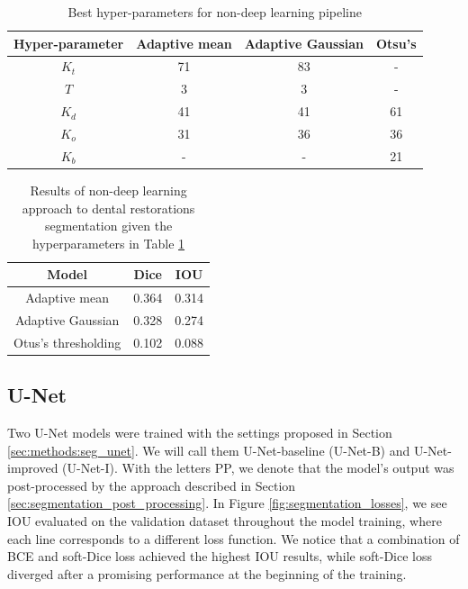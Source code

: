 \begin{table}[H]
    \begin{tabular}{|c|c|c|c|}
        \hline
        Hyper-parameter & Adaptive mean & Adaptive Gaussian & Otsu's \\ \hline
        $K_t$           & 71            & 83                & -      \\ \hline
        $T$             & 3             & 3                 & -      \\ \hline
        $K_d$           & 41            & 41                & 61     \\ \hline
        $K_o$           & 31            & 36                & 36     \\ \hline
        $K_b$           & -             & -                 & 21     \\ \hline
    \end{tabular}
    \caption{Best hyper-parameters for non-deep learning pipeline}
    \label{tab:nondl_restorations:best_params}
\end{table}


\begin{table}[H]
    \centering
    \begin{tabular}{|c|c|c|}
        \hline
        Model               & Dice  & IOU   \\ \hline
        Adaptive mean       & 0.364 & 0.314 \\ \hline
        Adaptive Gaussian   & 0.328 & 0.274 \\ \hline
        Otus's thresholding & 0.102 & 0.088 \\ \hline
    \end{tabular}
    \caption{Results of non-deep learning approach to dental restorations segmentation given the hyperparameters in Table \ref{tab:nondl_restorations:best_params}}
    \label{tab:nondl_results}
\end{table}



\subsection{U-Net}
Two U-Net models were trained with the settings proposed in Section \ref{sec:methods:seg_unet}. We will call them U-Net-baseline (U-Net-B) and U-Net-improved (U-Net-I). With the letters PP, we denote that the model's output was post-processed by the approach described in Section \ref{sec:segmentation_post_processing}.
In Figure \ref{fig:segmentation_losses}, we see IOU evaluated on the validation dataset throughout the model training, where each line corresponds to a different loss function. We notice that a combination of BCE and soft-Dice loss achieved the highest IOU results, while soft-Dice loss diverged after a promising performance at the beginning of the training.

